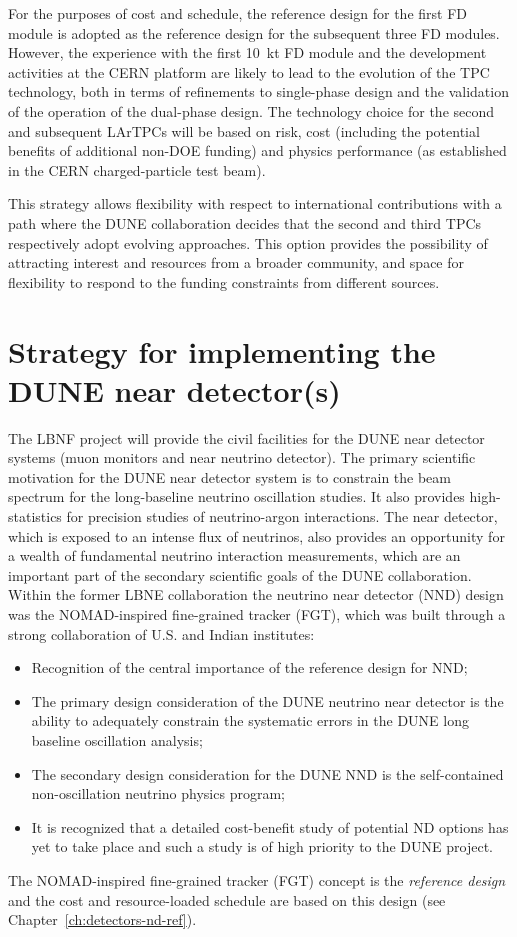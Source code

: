 For the purposes of cost and schedule, the reference design for the
first FD module is adopted as the reference design for the subsequent
three FD modules. However, the experience with the first 10~kt FD
module and the development activities at the CERN platform are likely
to lead to the evolution of the TPC technology, both in terms of
refinements to single-phase design and the validation of the operation
of the dual-phase design.  The technology choice for the second and
subsequent LArTPCs will be based on risk, cost (including the
potential benefits of additional non-DOE funding) and physics
performance (as established in the CERN charged-particle test beam).

This strategy allows flexibility with respect to international
contributions with a path where the DUNE collaboration decides that
the second and third TPCs respectively adopt evolving approaches. This
option provides the possibility of attracting interest and resources
from a broader community, and space for flexibility to respond to the
funding constraints from different sources.

\section{Strategy for implementing the DUNE near detector(s)}

The LBNF project will provide the civil facilities for the DUNE near detector systems 
(muon monitors and near neutrino detector). The primary scientific motivation for 
the DUNE near detector system is to constrain the beam spectrum for the long-baseline 
neutrino oscillation studies. It also provides high-statistics for precision studies 
of neutrino-argon interactions. The near detector, which is exposed to an intense 
flux of neutrinos, also provides an opportunity for a wealth of fundamental neutrino 
interaction measurements, which are an important part of the secondary scientific 
goals of the DUNE collaboration. Within the former LBNE collaboration the neutrino 
near detector (NND) design was the NOMAD-inspired fine-grained tracker (FGT), which 
was built through a strong collaboration of U.S. and Indian institutes:
\begin{itemize}
\item Recognition of the central importance of the reference design for NND;
\item The primary design consideration of the DUNE neutrino near
  detector is the ability to adequately constrain the systematic
  errors in the DUNE long baseline oscillation analysis;
\item The secondary design consideration for the DUNE NND is the
  self-contained non-oscillation neutrino physics program;
\item It is recognized that a detailed cost-benefit study of potential
  ND options has yet to take place and such a study is of high
  priority to the DUNE project.
\end{itemize}
The NOMAD-inspired fine-grained tracker (FGT) concept is the
\textit{reference design} and the cost and resource-loaded schedule
are based on this design (see Chapter~\ref{ch:detectors-nd-ref}).  

